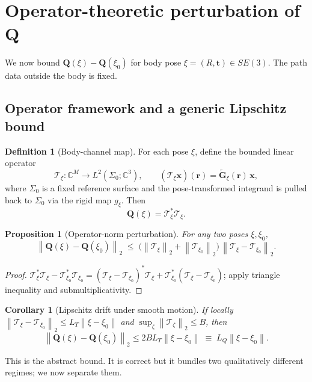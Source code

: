 \documentclass[11pt,a4paper]{article}
\newtheorem{proposition}[theorem]{Proposition}
\newtheorem{corollary}[theorem]{Corollary}
\theoremstyle{definition}
\newtheorem{definition}[theorem]{Definition}
\newcommand{\rr}{\mathbf{r}}
\newcommand{\xx}{\mathbf{x}}
\newcommand{\Q}{\mathbf{Q}}
\newcommand{\Gt}{\widetilde{\mathbf{G}}}
\newcommand{\Sigmaset}{\Sigma}
\newcommand{\C}{\mathbb{C}}
\newcommand{\norm}[1]{\left\lVert #1 \right\rVert}
\newcommand{\Top}{\mathcal{T}}
\begin{document}
\section{Operator-theoretic perturbation of \texorpdfstring{$\Q$}{Q}}
\label{sec:perturbation}

We now bound $\Q(\xi)-\Q(\xi_0)$ for body pose
$\xi=(R,\mathbf{t})\in SE(3)$. The path data outside the body is fixed.

\subsection{Operator framework and a generic Lipschitz bound}
\label{sec:op-framework}

\begin{definition}[Body-channel map]
For each pose $\xi$, define the bounded linear operator
\[
  \Top_\xi:\C^M \to L^2(\Sigmaset_0;\C^3),
  \qquad
  (\Top_\xi\xx)(\rr) = \Gt_\xi(\rr)\,\xx,
\]
where $\Sigmaset_0$ is a fixed reference surface and the
pose-transformed integrand is pulled back to $\Sigmaset_0$ via the
rigid map $g_\xi$. Then
\[
  \Q(\xi) = \Top_\xi^*\Top_\xi.
\]
\end{definition}

\begin{proposition}[Operator-norm perturbation]
\label{prop:op-perturbation}
For any two poses $\xi,\xi_0$,
\begin{equation}
  \norm{\Q(\xi)-\Q(\xi_0)}_2 \;\le\;
  \bigl(\norm{\Top_\xi}_2 + \norm{\Top_{\xi_0}}_2\bigr)\,
  \norm{\Top_\xi-\Top_{\xi_0}}_2.
  \label{eq:op-norm-bound}
\end{equation}
\end{proposition}

\begin{proof}
$\Top_\xi^*\Top_\xi - \Top_{\xi_0}^*\Top_{\xi_0}
 = (\Top_\xi - \Top_{\xi_0})^*\Top_\xi + \Top_{\xi_0}^*(\Top_\xi - \Top_{\xi_0})$;
apply triangle inequality and submultiplicativity.
\end{proof}

\begin{corollary}[Lipschitz drift under smooth motion]
\label{cor:lipschitz}
If locally $\norm{\Top_\xi-\Top_{\xi_0}}_2 \le L_T\norm{\xi-\xi_0}$ and
$\sup_\zeta\norm{\Top_\zeta}_2\le B$, then
\[
  \norm{\Q(\xi)-\Q(\xi_0)}_2 \le 2BL_T\norm{\xi-\xi_0}
  \;\equiv\; L_Q\norm{\xi-\xi_0}.
\]
\end{corollary}

This is the abstract bound. It is correct but it bundles two
qualitatively different regimes; we now separate them.
\end{document}
